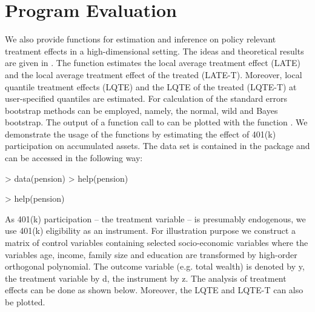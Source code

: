 \documentclass{amsart}
\begin{document}
\section{Program Evaluation}
We also provide functions for estimation and inference on policy relevant treatment effects in a high-dimensional setting. The ideas and theoretical results are given in \cite{BCFH:Policy}. The function  estimates the local average treatment effect (LATE) and the local average treatment effect of the treated (LATE-T). Moreover, local quantile treatment effects (LQTE) and the LQTE of the treated (LQTE-T) at user-specified quantiles are estimated. For calculation of the standard errors bootstrap methods can be employed, namely, the normal, wild and Bayes bootstrap. The output of a function call to  can be plotted with the function .
We demonstrate the usage of the functions by estimating the effect of 401(k) participation on accumulated assets. The data set is contained in the package and can be accessed in the following way:
\begin{Schunk}
\begin{Sinput}
> data(pension)
> help(pension)
\end{Sinput}
\end{Schunk}

\begin{Schunk}
\begin{Sinput}
> help(pension)
\end{Sinput}
\end{Schunk}

As 401(k) participation -- the treatment variable -- is presumably endogenous, we use 401(k) eligibility as an instrument. For illustration purpose we construct a matrix of control variables containing selected socio-economic variables where the variables age, income, family size and education are transformed by high-order orthogonal polynomial. The outcome variable (e.g. total wealth) is denoted by y, the treatment variable by d, the instrument by z. The analysis of treatment effects can be done as shown below. Moreover, the LQTE and LQTE-T can also be plotted.
\end{document}
